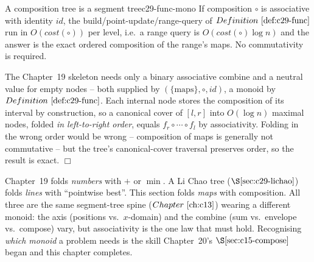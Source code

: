 \begin{theorem}{A composition tree is a segment tree}{c29-func-mono}
If composition \(\circ\) is associative with identity \(\mathit{id}\), the
build/point-update/range-query of \(\defref{c29-func}\) run in \(O(\mathit{cost}(\circ))\)
per level, i.e.\ a range query is \(O(\mathit{cost}(\circ)\log n)\) and the answer
is the exact ordered composition of the range's maps.  No commutativity is
required.
\end{theorem}
\begin{proofbox}
The Chapter~19 skeleton needs only a binary associative combine and a neutral
value for empty nodes -- both supplied by \((\{\text{maps}\},\circ,\mathit{id})\),
a monoid by \(\defref{c29-func}\).  Each internal node stores the composition of
its interval by construction, so a canonical cover of \([l,r]\) into \(O(\log n)\)
maximal nodes, folded \emph{in left-to-right order}, equals \(f_r\circ\cdots\circ
f_l\) by associativity.  Folding in the wrong order would be wrong -- composition
of maps is generally not commutative -- but the tree's canonical-cover traversal
preserves order, so the result is exact. \(\Box\)
\end{proofbox}

\begin{insightbox}
Chapter~19 folds \emph{numbers} with \(+\) or \(\min\).  A Li Chao tree
(\(\secref{c29-lichao}\)) folds \emph{lines} with ``pointwise best''.  This section
folds \emph{maps} with composition.  All three are the same segment-tree spine
(\(\chref{c13}\)) wearing a different monoid: the axis (positions vs.\
\(x\)-domain) and the combine (sum vs.\ envelope vs.\ compose) vary, but
associativity is the one law that must hold.  Recognising \emph{which monoid} a
problem needs is the skill Chapter~20's \(\secref{c15-compose}\) began and this
chapter completes.
\end{insightbox}

